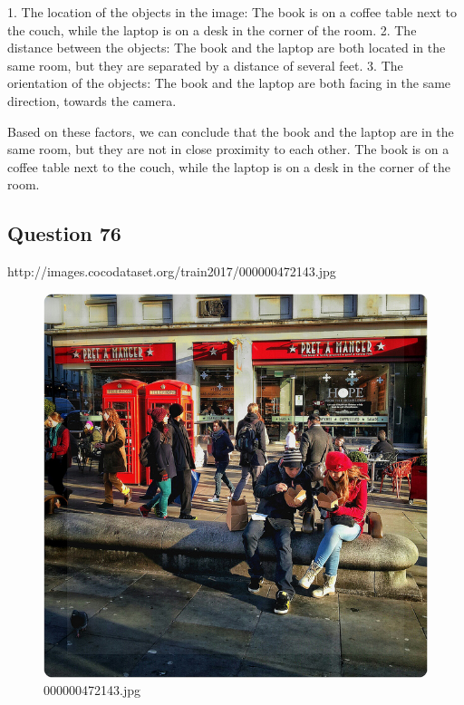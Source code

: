 \begin{enumerate}
    1. The location of the objects in the image: The book is on a coffee table next to the couch, while the laptop is on a desk in the corner of the room.
    2. The distance between the objects: The book and the laptop are both located in the same room, but they are separated by a distance of several feet.
    3. The orientation of the objects: The book and the laptop are both facing in the same direction, towards the camera.
    
    Based on these factors, we can conclude that the book and the laptop are in the same room, but they are not in close proximity to each other. The book is on a coffee table next to the couch, while the laptop is on a desk in the corner of the room.
\end{enumerate}
\subsection*{Question 76}
http://images.cocodataset.org/train2017/000000472143.jpg
\begin{figure}[h]
    \centering
    \includegraphics[width=0.8\linewidth]{../image set/hard/000000472143.jpg}
    \caption{000000472143.jpg}
\end{figure}
